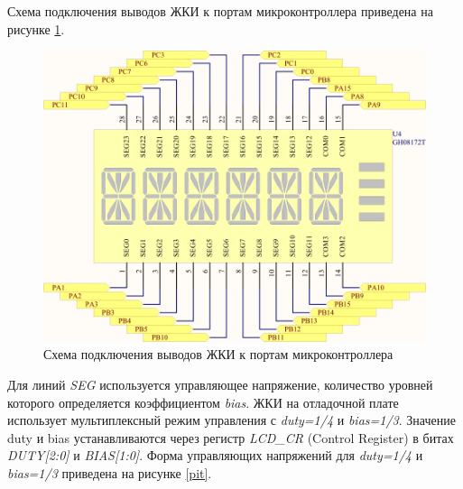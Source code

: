 Схема подключения выводов ЖКИ к портам микроконтроллера приведена на рисунке \ref{shema2}.


\begin{figure}[H]
\begin{center}
\includegraphics[scale=0.38]{Image/36.jpg} 
\end{center}
\caption{Схема подключения выводов ЖКИ к портам микроконтроллера}\label{shema2}
\end{figure}

Для линий \textit{SEG} используется управляющее напряжение, количество уровней которого определяется коэффициентом \textit{bias}. ЖКИ на отладочной плате использует мультиплексный режим управления с \textit{duty=1/4} и\textit{ bias=1/3}. Значение duty и bias устанавливаются через регистр \textit{LCD\_CR} (Control Register) в битах \textit{DUTY[2:0]} и\textit{ BIAS[1:0]}. Форма управляющих напряжений для \textit{duty=1/4} и \textit{bias=1/3} приведена на рисунке \ref{pit}.


